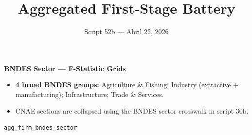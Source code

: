 \documentclass[aspectratio=169,10pt]{beamer}
\title{Aggregated First-Stage Battery}
\subtitle{Script 52b --- Abril 22, 2026}
\author{}
\date{}
\begin{document}
\begin{frame}
\titlepage
\end{frame}


\begin{frame}[plain]
\begin{center}
{\Large\textbf{BNDES Sector --- F-Statistic Grids}}\\[0.5em]
\end{center}
\small
\begin{itemize}
\item \textbf{4 broad BNDES groups:} Agriculture \& Fishing; Industry (extractive + manufacturing); Infrastructure; Trade \& Services.
\item CNAE sections are collapsed using the BNDES sector crosswalk in script 30b.
\end{itemize}
\vfill
\begin{center}
{\scriptsize \texttt{agg\_firm\_bndes\_sector}}
\end{center}
\end{frame}
\end{document}
